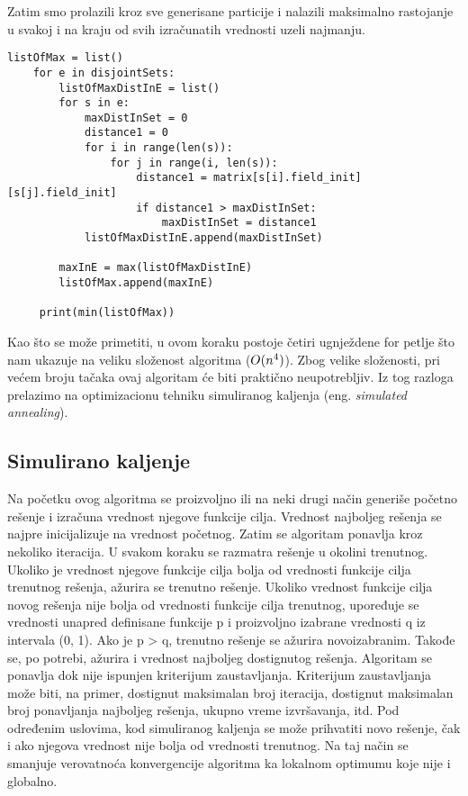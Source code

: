 \documentclass[a4paper]{article}
\begin{document}
Zatim smo prolazili kroz sve generisane particije i nalazili maksimalno rastojanje u svakoj i na kraju od svih izračunatih vrednosti uzeli najmanju. 

\begin{lstlisting}[title=Program 3: Nalaženje minimalnog rastojanja]
    listOfMax = list()
    for e in disjointSets:
        listOfMaxDistInE = list()
        for s in e:
            maxDistInSet = 0
            distance1 = 0
            for i in range(len(s)):
                for j in range(i, len(s)):
                    distance1 = matrix[s[i].field_init][s[j].field_init]
                    if distance1 > maxDistInSet:
                        maxDistInSet = distance1
            listOfMaxDistInE.append(maxDistInSet)

        maxInE = max(listOfMaxDistInE)
        listOfMax.append(maxInE)
        
     print(min(listOfMax))
\end{lstlisting}

Kao što se može primetiti, u ovom koraku postoje četiri ugnježdene for petlje što nam ukazuje na veliku složenost algoritma ($\small O(n^4)$). Zbog velike složenosti, pri većem broju tačaka ovaj algoritam će biti praktično neupotrebljiv. Iz tog razloga prelazimo na optimizacionu tehniku simuliranog kaljenja (eng. \textit{simulated annealing}).\\


\subsection{Simulirano kaljenje}
Na početku ovog algoritma se proizvoljno ili na neki drugi način generiše početno rešenje i izračuna vrednost njegove funkcije cilja. Vrednost najboljeg rešenja se najpre inicijalizuje na vrednost početnog. Zatim se algoritam ponavlja kroz nekoliko iteracija. U svakom koraku se razmatra rešenje u okolini trenutnog. Ukoliko je vrednost njegove funkcije cilja bolja od vrednosti funkcije cilja trenutnog rešenja, ažurira se trenutno rešenje. Ukoliko vrednost funkcije cilja novog rešenja nije bolja od vrednosti funkcije cilja trenutnog, upoređuje se vrednosti unapred definisane funkcije p i proizvoljno izabrane vrednosti q iz intervala (0, 1). Ako je p > q, trenutno rešenje se ažurira novoizabranim. Takođe se, po potrebi, ažurira i vrednost najboljeg dostignutog rešenja. Algoritam se ponavlja dok nije ispunjen kriterijum zaustavljanja. Kriterijum zaustavljanja može biti, na primer, dostignut maksimalan broj iteracija, dostignut maksimalan broj ponavljanja najboljeg rešenja, ukupno vreme izvršavanja, itd. Pod određenim uslovima, kod simuliranog kaljenja se može prihvatiti novo rešenje, čak i ako njegova vrednost nije bolja od vrednosti trenutnog. Na taj način se smanjuje verovatnoća konvergencije algoritma ka lokalnom optimumu koje nije i globalno.\cite{miskovic} \\ 
\end{document}
